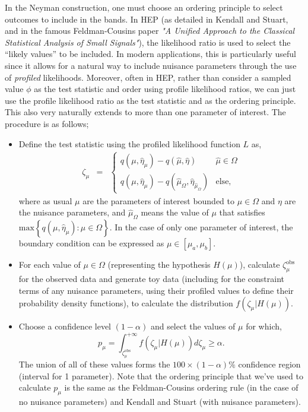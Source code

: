 In the Neyman construction, one must choose an ordering principle to select outcomes to include in the bands. In HEP (as detailed in Kendall and Stuart, and in the famous Feldman-Cousins paper \emph{"A Unified Approach to the Classical Statistical Analysis of Small Signals"}), the likelihood ratio is used to select the ``likely values'' to be included. In modern applications, this is particularly useful since it allows for a natural way to include nuisance parameters through the use of \emph{profiled} likelihoods. Moreover, often in HEP, rather than consider a sampled value $\phi$ as the test statistic and order using profile likelihood ratios, we can just use the profile likelihood ratio as the test statistic and as the ordering principle. This also very naturally extends to more than one parameter of interest. The procedure is as follows;
\begin{itemize}
    \item Define the test statistic using the profiled likelihood function $L$ as, 
    \begin{eqnarray}
        \zeta_{\mu} &= & \begin{cases}
               q(\mu,\hat{\eta}_{\mu})-q(\hat{\mu},\hat{\eta})    & \hat{\mu} \in \Omega \\
               q(\mu,\hat{\eta}_{\mu})-q(\hat{\mu}_{\Omega},\hat{\eta}_{\hat{\mu}_{\Omega}})            & \mathrm{else,}
                \end{cases}
    \end{eqnarray}
    where as usual $\mu$ are the parameters of interest bounded to $\mu\in\Omega$ and $\eta$ are the nuisance parameters, and $\hat{\mu}_{\Omega}$ means the value of $\mu$ that satisfies $\mathrm{max}\left\{q(\mu,\hat{\eta}_{\mu}):\mu\in\Omega\right\}$. 
    In the case of only one parameter of interest, the boundary condition can be expressed as $\mu\in[\mu_{a},\mu_{b}]$. 
    \item For each value of $\mu\in\Omega$ (representing the hypothesis $H(\mu)$), calculate $\zeta_{\mu}^{\mathrm{obs}}$ for the observed data and generate toy data (including for the constraint terms of any nuisance parameters, using their profiled values to define their probability density functions), to calculate the distribution $f(\zeta_{\mu}|H(\mu))$. 
    \item Choose a confidence level $(1-\alpha)$ and select the values of $\mu$ for which, 
    \begin{equation}
        p_{\mu}= \int_{\zeta_{\mu}^{\mathrm{obs}}}^{+\infty} f(\zeta_{\mu}|H(\mu)) d\zeta_{\mu} \geq \alpha.
    \end{equation}
    The union of all of these values forms the $100\times(1-\alpha)\%$ confidence region (interval for 1 parameter). Note that the ordering principle that we've used to calculate $p_{\mu}$ is the same as the Feldman-Cousins ordering rule (in the case of no nuisance parameters) and Kendall and Stuart (with nuisance parameters).  
\end{itemize}

